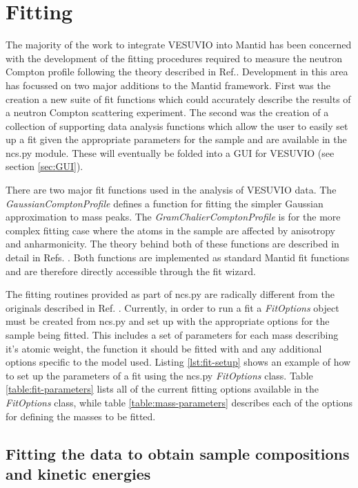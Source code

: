 \documentclass[paper=a4, fontsize=11pt]{scrartcl}	%
\numberwithin{equation}{section}															%
\numberwithin{figure}{section}																%
\numberwithin{table}{section}
\begin{document}
\section{Fitting}
\label{sec:fitting}
The majority of the work to integrate VESUVIO into Mantid has been concerned with the development of the fitting procedures required to measure the neutron Compton profile following the theory described in Ref.\citep{mayers2012vesuvio}. Development in this area has focussed on two major additions to the Mantid framework. First was the creation a new suite of fit functions which could accurately describe the results of a neutron Compton scattering experiment. The second was the creation of a collection of supporting data analysis functions which allow the user to easily set up a fit given the appropriate parameters for the sample and are available in the ncs.py module. These will eventually be folded into a GUI for VESUVIO (see section \ref{sec:GUI}).

There are two major fit functions used in the analysis of VESUVIO data. The \textit{GaussianComptonProfile} defines a function for fitting the simpler Gaussian approximation to mass peaks. The \textit{GramChalierComptonProfile} is for the more complex fitting case where the atoms in the sample are affected by anisotropy and anharmonicity. The theory behind both of these functions are described in detail in Refs. \cite{mayers2012vesuvio, andreani2005measurement}. Both functions are implemented as standard Mantid fit functions and are therefore directly accessible through the fit wizard.

The fitting routines provided as part of ncs.py are radically different from the originals described in Ref. \cite{mayers2010user}. Currently, in order to run a fit a \textit{FitOptions} object must be created from ncs.py and set up with the appropriate options for the sample being fitted. This includes a set of parameters for each mass describing it's atomic weight, the function it should be fitted with and any additional options specific to the model used. Listing \ref{lst:fit-setup} shows an example of how to set up the parameters of a fit using the ncs.py \textit{FitOptions} class. Table \ref{table:fit-parameters} lists all of the current fitting options available in the \textit{FitOptions} class, while table \ref{table:mass-parameters} describes each of the options for defining the masses to be fitted.

\subsection{Fitting the data to obtain sample compositions and kinetic energies}
\label{subsec:fitting-composition-kinetic}
\end{document}
